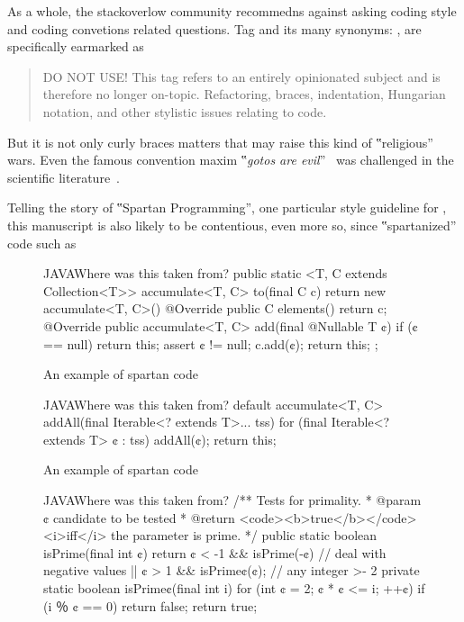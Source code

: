 As a whole, the stackoverlow community
recommedns against asking coding style and coding convetions related questions.
Tag  and its many synonyms: ,
 are specifically
earmarked as
\begin{quote}
DO NOT USE! This tag refers to an entirely opinionated subject and is therefore
no longer on-topic. Refactoring, braces, indentation, Hungarian notation, and
other stylistic issues relating to code.
\end{quote}
But it is not only curly braces matters that may raise
this kind of ‟religious” wars. Even the famous convention maxim ‟\emph{gotos
are evil}”~\cite{Dijksta:must be in bib} was challenged in the scientific
literature~\cite{Knuth: and there are several others}.

Telling the story of ‟Spartan Programming”, one particular style guideline for
\Java, this manuscript is also likely to be contentious, even more so, since
‟spartanized” code such as

\begin{figure}[h]
\label{figure:shock}
\caption{An example of spartan code}
  \begin{Code}{JAVA}{Where was this taken from?}
public static <T, C extends Collection<T>> accumulate<T, C> 
  to(final C c) {
    return new accumulate<T, C>() {
      @Override public C elements() {
        return c;
      }
      @Override public accumulate<T, C> 
        add(final @Nullable T ¢) {
          if (¢ == null)
            return this;
          assert ¢ != null;
          c.add(¢);
          return this;
        }
    };
  }
\end{Code}
\end{figure}

\begin{figure}[h]
\begin{Code}{JAVA}{Where was this taken from?}
default accumulate<T, C> addAll(final Iterable<? extends T>... tss) {
  for (final Iterable<? extends T> ¢ : tss)
    addAll(¢);
  return this;
}
\end{Code}
\label{figure:shock-2}
\caption{An example of spartan code}
\end{figure}

\begin{figure}[h]
\begin{Code}{JAVA}{Where was this taken from?}
/** Tests for primality.
  * @param ¢ candidate to be tested
  * @return <code><b>true</b></code> <i>iff</i> the parameter is prime. */
public static boolean isPrime(final int ¢) {
  return ¢ < -1 && isPrime(-¢) // deal with negative values
      || ¢ > 1 && isPrime¢(¢); // any integer >- 2
}
private static boolean isPrime¢(final int i) {
  for (int ¢ = 2; ¢ * ¢ <= i; ++¢)
    if (i ％ ¢ == 0)
      return false;
  return true;
}
\end{Code}
\end{figure}

